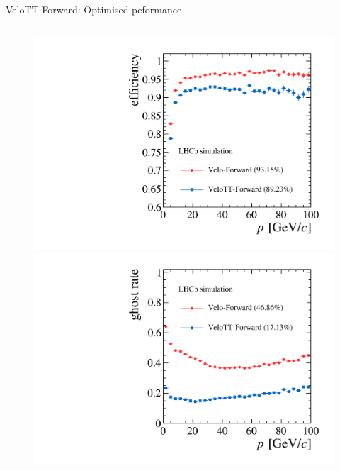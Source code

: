 \documentclass[aspectratio=1610]{beamer}
\begin{document}
\begin{frame}{VeloTT-Forward: Optimised peformance}
\begin{columns}
\begin{column}{0.35\textwidth}
\centering
\begin{figure}
\vspace*{-1cm}
\includegraphics[height=0.475\textheight]{figs/upstream-tracking-run2/Forward-eff-p.pdf}\\
\includegraphics[height=0.475\textheight]{figs/upstream-tracking-run2/Forward-gr-p.pdf}
\end{figure}
\end{column}
\end{columns}

\end{frame}
\end{document}
